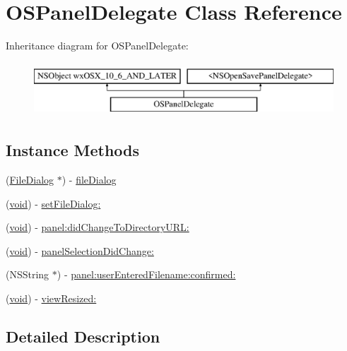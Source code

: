 \hypertarget{interface_o_s_panel_delegate}{}\section{O\+S\+Panel\+Delegate Class Reference}
\label{interface_o_s_panel_delegate}
Inheritance diagram for O\+S\+Panel\+Delegate\+:\begin{figure}[H]
\begin{center}
\leavevmode
\includegraphics[height=2.000000cm]{interface_o_s_panel_delegate}
\end{center}
\end{figure}
\subsection*{Instance Methods}
\begin{DoxyCompactItemize}
\item 
(\hyperlink{class_file_dialog}{File\+Dialog} $\ast$) -\/ \hyperlink{interface_o_s_panel_delegate_a10e46303a8ff19ab4cd5af45d43e5dce}{file\+Dialog}
\item 
(\hyperlink{sound_8c_ae35f5844602719cf66324f4de2a658b3}{void}) -\/ \hyperlink{interface_o_s_panel_delegate_a91fdbd18dd2a293326682ae1ca942918}{set\+File\+Dialog\+:}
\item 
(\hyperlink{sound_8c_ae35f5844602719cf66324f4de2a658b3}{void}) -\/ \hyperlink{interface_o_s_panel_delegate_adc146df259888f119a1c6e352b114cdd}{panel\+:did\+Change\+To\+Directory\+U\+R\+L\+:}
\item 
(\hyperlink{sound_8c_ae35f5844602719cf66324f4de2a658b3}{void}) -\/ \hyperlink{interface_o_s_panel_delegate_aa5afb4c491f35f72e972b888030e2d74}{panel\+Selection\+Did\+Change\+:}
\item 
(N\+S\+String $\ast$) -\/ \hyperlink{interface_o_s_panel_delegate_a73bee7af7f723ada7b3764ade7e03573}{panel\+:user\+Entered\+Filename\+:confirmed\+:}
\item 
(\hyperlink{sound_8c_ae35f5844602719cf66324f4de2a658b3}{void}) -\/ \hyperlink{interface_o_s_panel_delegate_aa40b4d52ba16f556c8a7fb6cbc57cf39}{view\+Resized\+:}
\end{DoxyCompactItemize}


\subsection{Detailed Description}


